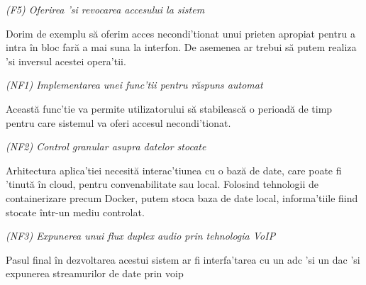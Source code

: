 \noindent
\textit{(F5) Oferirea 'si revocarea accesului la sistem}

Dorim de exemplu să oferim acces necondi'tionat unui prieten apropiat pentru a intra în bloc fară a mai suna la interfon. De asemenea ar trebui să putem realiza 'si inversul acestei opera'tii.

\noindent
\textit{(NF1) Implementarea unei func'tii pentru răspuns automat}

Această func'tie va permite utilizatorului să stabilească o perioadă de timp pentru care sistemul va oferi accesul necondi'tionat.

\noindent
\textit{(NF2) Control granular asupra datelor stocate}

Arhitectura aplica'tiei necesită interac'tiunea cu o bază de date, care poate fi 'tinută în cloud, pentru convenabilitate sau local.
Folosind tehnologii de containerizare precum Docker, putem stoca baza de date local, informa'tiile fiind stocate într-un mediu controlat.

\noindent
\textit{(NF3) Expunerea unui flux duplex audio prin tehnologia VoIP}

Pasul final în dezvoltarea acestui sistem ar fi interfa'tarea cu un \acrfull{adc} 'si un \acrfull{dac} 'si expunerea streamurilor de date prin \acrfull{voip}

